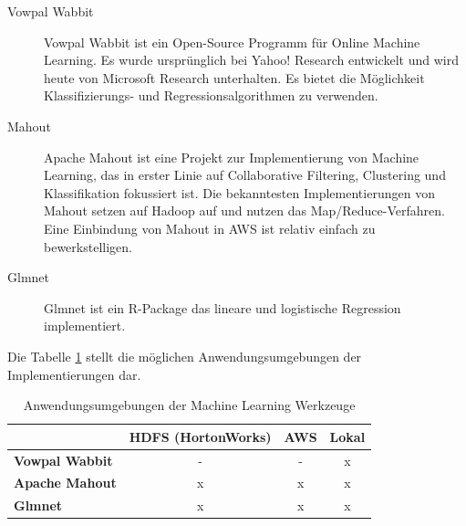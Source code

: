 \begin{description}
\item[Vowpal Wabbit] Vowpal Wabbit ist ein Open-Source Programm für Online Machine Learning. Es wurde ursprünglich bei Yahoo! Research entwickelt und wird heute von Microsoft Research unterhalten. Es bietet die Möglichkeit Klassifizierungs- und Regressionsalgorithmen zu verwenden.

\item[Mahout] Apache Mahout ist eine Projekt zur Implementierung von Machine Learning, das in erster Linie auf Collaborative Filtering, Clustering und Klassifikation fokussiert ist. Die bekanntesten Implementierungen von Mahout setzen auf Hadoop auf und nutzen das Map/Reduce-Verfahren. Eine Einbindung von Mahout in AWS ist relativ einfach zu bewerkstelligen.

\item[Glmnet] Glmnet ist ein R-Package das lineare und logistische Regression implementiert.
\end{description}

Die Tabelle \ref{tab:MachineLearningTools} stellt die möglichen Anwendungsumgebungen der Implementierungen dar.

\begin{table}[H]
	\centering
\begin{tabular}{l|c|c|c} 
	\textbf{} & \textbf{HDFS (HortonWorks)} & \textbf{AWS} & \textbf{Lokal}  \\  
	\hline \textbf{Vowpal Wabbit} & - & - & x \\
	\hline \textbf{Apache Mahout} & x & x & x \\
	\hline \textbf{Glmnet} & x & x & x 
	\vspace{0.3cm} 
\end{tabular} 
\caption{Anwendungsumgebungen der Machine Learning Werkzeuge}
\label{tab:MachineLearningTools}
\end{table}

